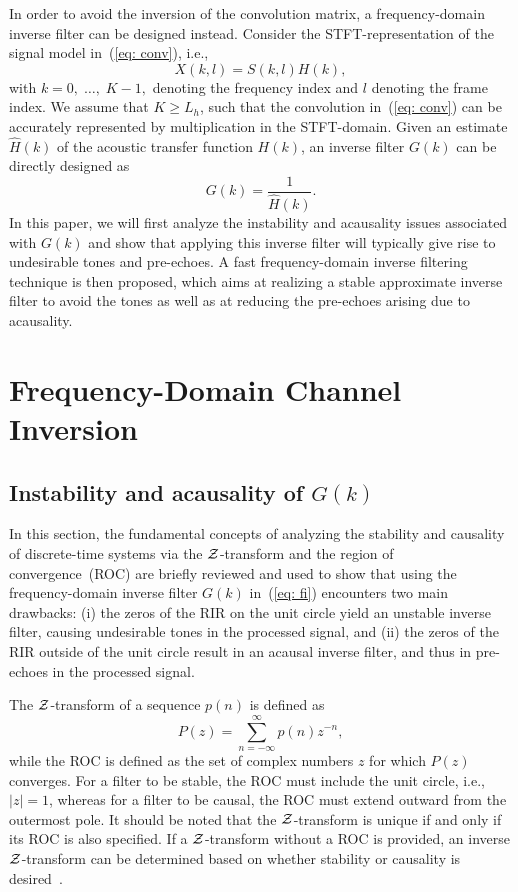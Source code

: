 \documentclass{article}
\begin{document}
In order to avoid the inversion of the convolution matrix, a frequency-domain inverse filter can be designed instead.
Consider the STFT-representation of the signal model in~(\ref{eq: conv}), i.e.,
\begin{equation}
  \label{eq: stft}
  X(k,l)= S(k,l) H(k),
\end{equation}
with $k = 0, \; \ldots, \; K-1,$ denoting the frequency index and $l$ denoting the frame index.
We assume that $K \geq L_h$, such that the convolution in~(\ref{eq: conv}) can be accurately represented by multiplication in the STFT-domain.
Given an estimate $\hat{H}(k)$ of the acoustic transfer function $H(k)$, an inverse filter $G(k)$ can be directly designed as
\begin{equation}
\label{eq: fi}
  G(k) = \frac{1}{\hat{H}(k)}.
\end{equation}
In this paper, we will first analyze the instability and acausality issues associated with $G(k)$ and show that applying this inverse filter will typically give rise to undesirable tones and pre-echoes.
A fast frequency-domain inverse filtering technique is then proposed, which aims at realizing a stable approximate inverse filter to avoid the tones as well as at reducing the pre-echoes arising due to acausality.

\section{Frequency-Domain Channel Inversion}
\subsection{Instability and acausality of $G(k)$}
\label{sec: analysis_z}
In this section, the fundamental concepts of analyzing the stability and causality of discrete-time systems via the $\cal{Z}$-transform and the region of convergence~(ROC) are briefly reviewed and used to show that using the frequency-domain inverse filter $G(k)$ in~(\ref{eq: fi}) encounters two main drawbacks: (i) the zeros of the RIR on the unit circle yield an unstable inverse filter, causing undesirable tones in the processed signal, and (ii)  the zeros of the RIR outside of the unit circle result in an acausal inverse filter, and thus in pre-echoes in the processed signal. 

The $\cal{Z}$-transform of a sequence $p(n)$ is defined as
\begin{equation}
  \label{eq: ztr}
  P(z) = \sum_{n = -\infty}^{\infty}p(n)z^{-n}, 
\end{equation}
while the ROC is defined as the set of complex numbers $z$ for which $P(z)$ converges.
For a filter to be stable, the ROC must include the unit circle, i.e., $|z| = 1$, whereas for a filter to be causal, the ROC must extend outward from the outermost pole.  
It should be noted that the $\cal{Z}$-transform is unique if and only if its ROC is also specified.
If a $\cal{Z}$-transform without a ROC is provided, an inverse $\cal{Z}$-transform can be determined based on whether stability or causality is desired~\cite{oppenheim_1996}.
\end{document}
